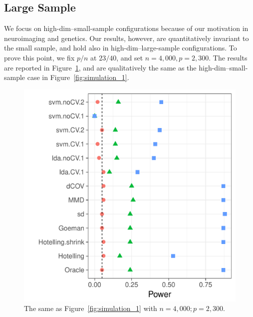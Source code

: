 \documentclass[journal]{IEEEtran}
\begin{document}
\subsection{Large Sample}
\label{sec:large-sample}

We focus on high-dim--small-sample configurations because of our motivation in neuroimaging and genetics. 
Our results, however, are quantitatively invariant to the small sample, and hold also in high-dim--large-sample configurations.
To prove this point, we fix $p/n$ at $23/40$, and set $n=4,000, p=2,300$. 
The results are reported in Figure~\ref{fig:large-sample}, and are qualitatively the same as the high-dim--small-sample case in Figure~\ref{fig:simulation_1}.


\begin{figure}[h]
	\centering
	\includegraphics[width=1\columnwidth]{"art/file1"}
	\caption{The same as Figure~\ref{fig:simulation_1} with $n=4,000; p=2,300$.}
	\label{fig:large-sample}
\end{figure}
\end{document}

